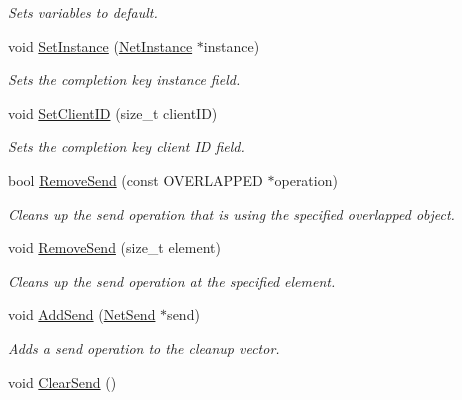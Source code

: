 \begin{DoxyCompactItemize}
\begin{DoxyCompactList}\small\item\em Sets variables to default. \item\end{DoxyCompactList}\item 
void \hyperlink{class_net_socket_aa5e8328367081d19e64a37e6b15703cf}{SetInstance} (\hyperlink{class_net_instance}{NetInstance} $\ast$instance)
\begin{DoxyCompactList}\small\item\em Sets the completion key instance field. \item\end{DoxyCompactList}\item 
void \hyperlink{class_net_socket_aafadb66f83b867d49633a304d1083cad}{SetClientID} (size\_\-t clientID)
\begin{DoxyCompactList}\small\item\em Sets the completion key client ID field. \item\end{DoxyCompactList}\item 
bool \hyperlink{class_net_socket_aedd848a5bbf20f92dcd2f2d68603a16a}{RemoveSend} (const OVERLAPPED $\ast$operation)
\begin{DoxyCompactList}\small\item\em Cleans up the send operation that is using the specified overlapped object. \item\end{DoxyCompactList}\item 
void \hyperlink{class_net_socket_ae6829ea0830059f1c21154a9c1392ed2}{RemoveSend} (size\_\-t element)
\begin{DoxyCompactList}\small\item\em Cleans up the send operation at the specified element. \item\end{DoxyCompactList}\item 
void \hyperlink{class_net_socket_a84eea723ebe08ab09554c56a07d5411a}{AddSend} (\hyperlink{class_net_send}{NetSend} $\ast$send)
\begin{DoxyCompactList}\small\item\em Adds a send operation to the cleanup vector. \item\end{DoxyCompactList}\item 
\hypertarget{class_net_socket_aea9f9a2581f8f07a22a0d36d3bb23654}{
void \hyperlink{class_net_socket_aea9f9a2581f8f07a22a0d36d3bb23654}{ClearSend} ()}
\label{class_net_socket_aea9f9a2581f8f07a22a0d36d3bb23654}


\end{DoxyCompactItemize}
